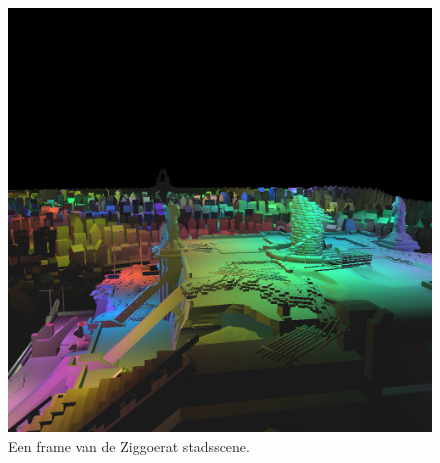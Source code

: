 \begin{figure}[t]
  \centering\includegraphics[width=\textwidth]{./img/raw/test-suite-ziggurat-city-frame.png}
  \caption{Een frame van de Ziggoerat stadsscene.}
  \label{fig:test-suite-ziggurat-frame}
  
\end{figure}
